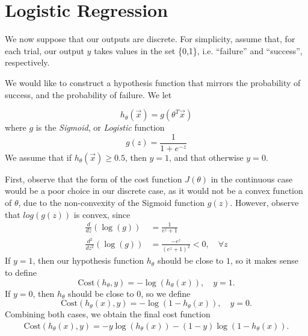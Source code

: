 \documentclass[12pt]{amsbook}
\theoremstyle{plain}
\theoremstyle{definition}
\theoremstyle{remark}
\numberwithin{equation}{section}  %
\numberwithin{equation}{section}  %
\begin{document}
\chapter{Logistic Regression}
We now suppose that our outputs are discrete. For simplicity, assume that, for
each trial, our output $y$ takes values in the set \{0,1\}, i.e. ``failure''
and ``success'', respectively.

We would like to construct a hypothesis function that mirrors the probability of
success, and the probability of failure. We let

\begin{equation*} 
h_{\theta}(\vec{x}) = g(\theta^{T}\vec{x})
\end{equation*}
where $g$ is the \emph{Sigmoid}, or \emph{Logistic} function
\begin{equation*} 
g(z) = \frac{1}{1+e^{-z}}
\end{equation*}
We assume that if $h_{\theta}(\vec{x}) \ge 0.5$, then $y=1$, and that otherwise 
$y = 0$.

First, observe that the form of the cost function $J(\theta)$ in the continuous
case would be a poor choice in our discrete case,
as it would not be a convex function of $\theta$, due to the non-convexity of
the Sigmoid function $g(z)$. However, observe that $log(g(z))$ is convex, since
\begin{equation*} 
\begin{split}
 \frac{d}{dz}(\log(g)) & = \frac{1}{e^{z}+1}\\
 \frac{d^{2}}{dz^{2}}(\log(g)) & = \frac{-e^{z}}{(e^{z}+1)^{2}} < 0, \quad
\forall z
\end{split} 
\end{equation*}
If $y=1$, then our hypothesis function $h_{\theta}$ should be close to $1$, so
it makes sense to define
\begin{equation*} 
\text{Cost}(h_{\theta}, y) = -\log(h_{\theta}(x)), \quad y=1.
\end{equation*}
If $y=0$, then $h_{\theta}$ should be close to $0$, so we define
\begin{equation*} 
\text{Cost}(h_{\theta}(x), y)= -\log(1 - h_{\theta}(x)), \quad y=0.
\end{equation*}
Combining both cases, we obtain the final cost function
\begin{equation*}
\begin{split}
	\text{Cost}(h_{\theta}(x), y) = -y\log(h_{\theta}(x)) -
	(1-y)\log(1-h_{\theta}(x)).
\end{split}
\end{equation*}
\end{document}
